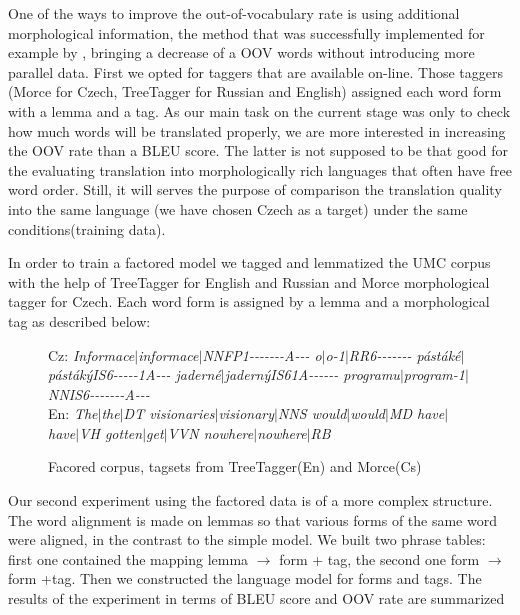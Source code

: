 \documentclass[11pt,letterpaper]{article}
\begin{document}
One of the ways to improve the out-of-vocabulary rate is using additional morphological
information, the method that was successfully implemented for example by \cite{turchi},
bringing a decrease of a OOV words without introducing more parallel data.
 First we opted for taggers that are available  on-line. Those taggers
(Morce for Czech, TreeTagger for Russian and English) assigned each word form with
a lemma and a tag. As our main task on the current stage was only to check
how much words will be translated properly, we are more interested in increasing
the OOV rate than a BLEU score. The latter is not supposed to be that 
good for the evaluating translation into morphologically rich languages that often have
free word order. Still, it will serves the purpose of comparison the translation 
quality into the same language (we have chosen Czech as a target) under the same conditions(training data).

In order to train a factored model we tagged and lemmatized the UMC corpus with
the help of TreeTagger %
for English and Russian and Morce
morphological tagger for Czech. %
Each word form is assigned by a lemma and a morphological tag as described below:

\begin{figure}
Cz: \textit{Informace$|$informace$|$NNFP1-{}-{}-{}-{}-{}-{}-A-{}-{}- o$|$o-1$|$RR6-{}-{}-{}-{}-{}-{}- 
pástáké$|$pástákýIS6-{}-{}-{}-{}-1A-{}-{}- jaderné$|$jadernýIS61A-{}-{}-{}-{}-{}- 
programu$|$program-1$|$NNIS6-{}-{}-{}-{}-{}-{}-A-{}-{}-}\\
En: \textit{The$|$the$|$DT visionaries$|$visionary$|$NNS would$|$would$|$MD have$|$have$|$VH gotten$|$get$|$VVN nowhere$|$nowhere$|$RB}
\caption{Facored corpus, tagsets from TreeTagger(En) and Morce(Cs)}
\label{fig:fact}
\end{figure}

Our second experiment using the factored data is of a more complex structure.
The word alignment is made on lemmas so that various forms of the same word
were aligned, in the contrast to the simple model. We built two phrase tables:
first one contained the mapping lemma $\rightarrow$ form + tag, the second one 
form $\rightarrow$ form +tag. Then we constructed the language model for forms
and tags. The results of the experiment in terms of BLEU score and OOV rate are 
summarized 
\end{document}
